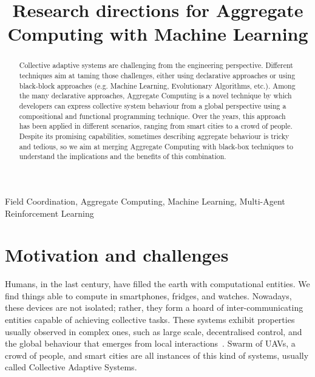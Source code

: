 \documentclass[conference]{IEEEtran}
\begin{document}
\title{Research directions for Aggregate Computing with Machine Learning}

\author{
}

\maketitle
\begin{abstract}
    Collective adaptive systems are challenging from the engineering perspective. Different techniques aim at taming those challenges, either using declarative approaches or using black-block approaches (e.g. Machine Learning, Evolutionary Algorithms, etc.).
    Among the many declarative approaches, Aggregate Computing is a novel technique by which developers can express collective system behaviour from a global perspective using a compositional and functional programming technique.
    Over the years, this approach has been applied in different scenarios, ranging from smart cities to a crowd of people. Despite its promising capabilities, sometimes describing aggregate behaviour is tricky and tedious, so we aim at merging Aggregate Computing with black-box techniques to understand the implications and the benefits of this combination.
\end{abstract}
\begin{IEEEkeywords}
Field Coordination, Aggregate Computing, Machine Learning, Multi-Agent Reinforcement Learning
\end{IEEEkeywords}

\section{Motivation and challenges}
Humans, in the last century, have filled the earth with computational entities. 
%
We find things able to compute in smartphones, fridges, and watches. %
Nowadays, these devices are not isolated; rather, they form a hoard of inter-communicating entities capable of achieving collective tasks. 
These systems exhibit properties usually observed in complex ones, such as large scale, 
decentralised control, and the global behaviour that emerges from local interactions~\cite{DBLP:conf/huc/Ferscha15}. 
Swarm of UAVs, a crowd of people, and smart cities are all instances of this kind of systems, usually called Collective Adaptive Systems.
\end{document}

